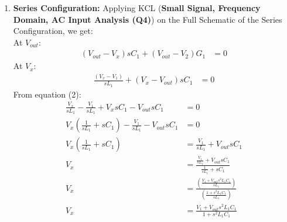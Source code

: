 \begin{enumerate}
    \paragraph{Total Parallel Response:}
      \begin{align*}
        V_{out} &= V_{out_1} + V_{out_2} \\
                &= H_1(s)V_{1} + H_2(s)V_{2} \\
                &= \left(\frac{G_1}{G_1 + \frac{1}{sL_1} + sC_1}\right)V_{1} + \left(\frac{\frac{1}{sL_1} + sC_1}{G_1 + \frac{1}{sL_1} + sC_1}\right)V_{2} \\
        V_{out} &= \underbrace{\frac{G_1}{G_1 + \frac{1}{sL_1} + sC_1}V_{1}}_{\text{Band Pass Character}} + \underbrace{\frac{\frac{1}{sL_1} + sC_1}{G_1 + \frac{1}{sL_1} + sC_1}V_{2}}_{\text{Band Stop Character}}
      \end{align*}
  \item \textbf{Series Configuration:}
    Applying KCL (\textbf{Small Signal, Frequency Domain, AC Input Analysis
    (Q4)}) on the Full Schematic of the Series Configuration, we get: \\
    At \(V_{out}\):
    \begin{align*}
      (V_{out} - V_{x})sC_1 + (V_{out} - V_{2}){G_1} &= 0 \tag{1}
    \end{align*}
    At \(V_{x}\):
    \begin{align*}
      \frac{(V_{x} - V_{1})}{sL_1} + (V_{x} - V_{out})sC_1 &= 0 \tag{2}
    \end{align*}
    From equation (2):
    \begin{align*}
      \frac{V_{x}}{sL_1} - \frac{V_{1}}{sL_1} + V_{x}sC_1 - V_{out}sC_1 &= 0 \\
      V_{x}(\frac{1}{sL_1} + sC_1) - \frac{V_{1}}{sL_1} - V_{out}sC_1 &= 0 \\
      V_{x}(\frac{1}{sL_1} + sC_1) &= \frac{V_{1}}{sL_1} + V_{out}sC_1 \\
      V_{x} &= \frac{\frac{V_{1}}{sL_1} + V_{out}sC_1}{\frac{1}{sL_1} + sC_1} \\
      V_{x} &= \frac{\left(\frac{V_{1} + V_{out}s^2 L_1 C_1}{s L_1}\right)}{\left(\frac{1 + s^2 L_1 C_1}{s L_1}\right)} \\
      V_{x} &= \frac{V_{1} + V_{out}s^2 L_1 C_1}{1 + s^2 L_1 C_1} \tag{3}
    \end{align*}

\end{enumerate}
